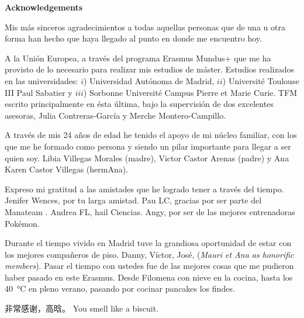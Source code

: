 \newpage
\thispagestyle{empty}

{\chancery

\textbf{\Huge{Acknowledgements}}

\vspace{1.5cm}

Mis más sinceros agradecimientos a todas aquellas personas que de una u otra
forma han hecho que haya llegado al punto en donde me encuentro hoy.

A la Unión Europea, a través del programa Erasmus Mundus+ que me ha provisto de
lo necesario para realizar mis estudios de máster. Estudios realizados en las
universidades: $i$) Universidad Autónoma de Madrid, $ii$) Université Toulouse
III Paul Sabatier y $iii$) Sorbonne Université Campus Pierre et Marie Curie.
TFM escrito principalmente en ésta última, bajo la supervisión de dos
excelentes asesoras, Julia Contreras-García y Merche Montero-Campillo.

A través de mis 24 años de edad he tenido el apoyo de mi núcleo familiar, con
los que me he formado como persona y siendo un pilar importante para llegar a
ser quien soy. Libia Villegas Morales (madre), Victor Castor Arenas (padre) y
Ana Karen Castor Villegas (hermAna).

Expreso mi gratitud a las amistades que he logrado tener a través del tiempo.
Jenifer Wences,
por tu larga amistad. 
Pau LC,
gracias por ser parte del Manateam .
Andrea FL, 
hail Ciencias.
Angy,
por ser de las mejores entrenadoras Pokémon.

Durante el tiempo vivido en Madrid tuve la grandiosa oportunidad de estar con
los mejores compañeros de piso. Danny, Víctor, José, (\textit{Mauri et Ana as
honorific members}). Pasar el tiempo con ustedes fue de las mejores cosas que
me pudieron haber pasado en este Erasmus. Desde Filomena con nieve en la
cocina, hasta los \SI{40}{\celsius} en pleno verano, pasando por cocinar
pancakes los findes.

\begin{CJK*}{UTF8}{gkai}
非常感谢，高晗。 You smell like a biscuit.
\end{CJK*} 

}
